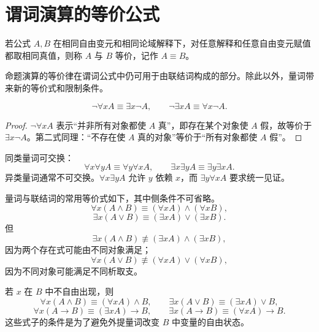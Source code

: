 \section{谓词演算的等价公式}

\begin{definition}[谓词公式等价]\label{ch06-equivalence}
若公式 $A,B$ 在相同自由变元和相同论域解释下，对任意解释和任意自由变元赋值都取相同真值，则称 $A$ 与 $B$ 等价，记作 $A\equiv B$。
\end{definition}

命题演算的等价律在谓词公式中仍可用于由联结词构成的部分。除此以外，量词带来新的等价式和限制条件。

\begin{theorem}[量词否定律]\label{ch2-quantifier-negation}
\[
\neg\forall xA\equiv\exists x\neg A,\qquad
\neg\exists xA\equiv\forall x\neg A.
\]
\end{theorem}
\begin{proof}
$\neg\forall xA$ 表示“并非所有对象都使 $A$ 真”，即存在某个对象使 $A$ 假，故等价于 $\exists x\neg A$。第二式同理：“不存在使 $A$ 真的对象”等价于“所有对象都使 $A$ 假”。
\end{proof}

同类量词可交换：
\[
\forall x\forall yA\equiv\forall y\forall xA,\qquad
\exists x\exists yA\equiv\exists y\exists xA.
\]
异类量词通常不可交换。$\forall x\exists yA$ 允许 $y$ 依赖 $x$，而 $\exists y\forall xA$ 要求统一见证。

量词与联结词的常用等价式如下，其中侧条件不可省略。
\[
\forall x(A\land B)\equiv(\forall xA)\land(\forall xB),
\]
\[
\exists x(A\lor B)\equiv(\exists xA)\lor(\exists xB).
\]
但
\[
\exists x(A\land B)\not\equiv(\exists xA)\land(\exists xB),
\]
因为两个存在式可能由不同对象满足；
\[
\forall x(A\lor B)\not\equiv(\forall xA)\lor(\forall xB),
\]
因为不同对象可能满足不同析取支。

若 $x$ 在 $B$ 中不自由出现，则
\[
\forall x(A\land B)\equiv(\forall xA)\land B,\qquad
\exists x(A\lor B)\equiv(\exists xA)\lor B,
\]
\[
\forall x(A\to B)\equiv(\exists xA)\to B,\qquad
\exists x(A\to B)\equiv(\forall xA)\to B.
\]
这些式子的条件是为了避免外提量词改变 $B$ 中变量的自由状态。

